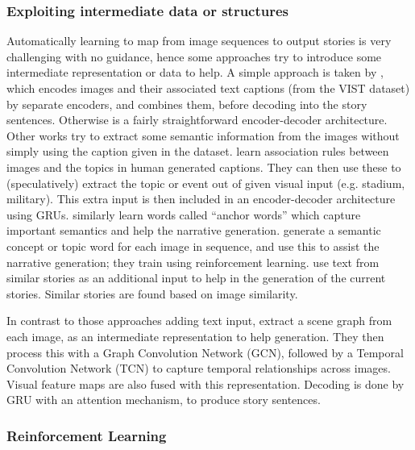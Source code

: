 \documentclass[a4paper,fleqn]{cas-sc}
\begin{document}
\subsubsection{ Exploiting intermediate data or structures}\label{interm}

Automatically learning to map from image sequences  to output stories is very challenging with no guidance, hence some approaches try to introduce some intermediate representation or data to help.
A simple approach is taken by \citet{Nahian2019}, which encodes images and their associated text captions (from the VIST dataset) by separate encoders, and combines them, before decoding into the story sentences. Otherwise \citet{Nahian2019} is a fairly straightforward encoder-decoder architecture.
Other works try to extract some semantic information from the images without simply using the caption given in the dataset.
\citet{li2019} learn association rules between images and the topics in human generated captions. They can then use these to (speculatively) extract the topic or event out of given visual input (e.g. stadium, military). This extra input is then included in an encoder-decoder architecture using GRUs.
\citet{Zhang2020} similarly learn words called  ``anchor words'' which capture important semantics and help the narrative generation.
\citet{Huang2019} generate a semantic concept or topic word for each image in sequence, and use this to assist the narrative generation; they train using reinforcement learning.
\citet{li2019t} use text from similar stories as an additional input to help in the generation of the current stories. Similar stories are found based on image similarity.

In contrast to those approaches adding text input, \citet{wangaaai2020} extract a scene graph from each image, as an intermediate representation to help generation. They then process this with a Graph Convolution Network (GCN), followed by a  Temporal
Convolution Network (TCN) to capture temporal relationships across images. Visual feature maps are also fused with this representation.
Decoding is done by GRU with an attention mechanism, to produce story sentences.

\subsubsection{ Reinforcement Learning}\label{RL}
\end{document}
